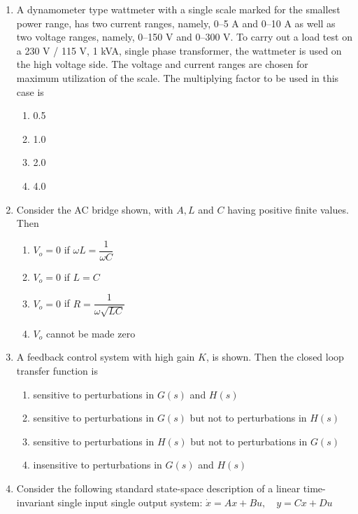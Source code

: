 \documentclass[journal]{IEEEtran}
\begin{document}
\begin{enumerate}
\item A dynamometer type wattmeter with a single scale marked for the smallest power range, has two current ranges, namely, 0--5 A and 0--10 A as well as two voltage ranges, namely, 0--150 V and 0--300 V.  
To carry out a load test on a 230 V / 115 V, 1 kVA, single phase transformer, the wattmeter is used on the high voltage side.  
The voltage and current ranges are chosen for maximum utilization of the scale. The multiplying factor to be used in this case is
\begin{multicols}{4}
\begin{enumerate}
\item 0.5  
\item 1.0  
\item 2.0  
\item 4.0  
\end{enumerate}
\end{multicols}

\item Consider the AC bridge shown, with $A, L$ and $C$ having positive finite values. Then
\begin{multicols}{2}
\begin{enumerate}
\item $V_o = 0$ if $\omega L = \dfrac{1}{\omega C}$  
\item $V_o = 0$ if $L = C$  
\item $V_o = 0$ if $R = \dfrac{1}{\omega \sqrt{LC}}$  
\item $V_o$ cannot be made zero  
\end{enumerate}
\end{multicols}

\item A feedback control system with high gain $K$, is shown.  
Then the closed loop transfer function is
\begin{enumerate}
\item sensitive to perturbations in $G(s)$ and $H(s)$  
\item sensitive to perturbations in $G(s)$ but not to perturbations in $H(s)$  
\item sensitive to perturbations in $H(s)$ but not to perturbations in $G(s)$  
\item insensitive to perturbations in $G(s)$ and $H(s)$  
\end{enumerate}

\item Consider the following standard state-space description of a linear time-invariant single input single output system:  
$\dot{x} = Ax + Bu, \quad y = Cx + Du$  


\end{enumerate}
\end{document}
